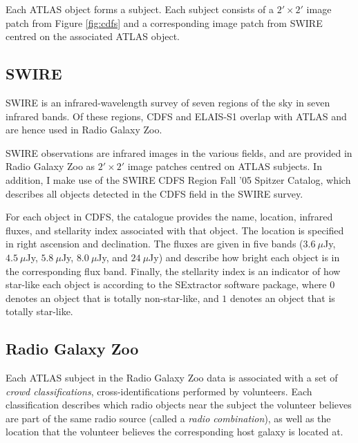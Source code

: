 \documentclass[a4paper]{article}
\newcommand{\fig}{Figure }
\begin{document}
      Each ATLAS object forms a subject. Each subject consists of a $2' \times 2'$ image patch from \fig \ref{fig:cdfs} and a corresponding image patch from SWIRE centred on the associated ATLAS object.

    \subsection{SWIRE}

      SWIRE is an infrared-wavelength survey of seven regions of the sky in seven infrared bands. Of these regions, CDFS and ELAIS-S1 overlap with ATLAS and are hence used in Radio Galaxy Zoo.

      SWIRE observations are infrared images in the various fields, and are provided in Radio Galaxy Zoo as $2' \times 2'$ image patches centred on ATLAS subjects. In addition, I make use of the SWIRE CDFS Region Fall '05 Spitzer Catalog\cite{surace05}, which describes all objects detected in the CDFS field in the SWIRE survey.

      For each object in CDFS, the catalogue provides the name, location, infrared fluxes, and stellarity index associated with that object. The location is specified in right ascension and declination. The fluxes are given in five bands ($3.6\ \mu$Jy, $4.5\ \mu$Jy, $5.8\ \mu$Jy, $8.0\ \mu$Jy, and $24\ \mu$Jy) and describe how bright each object is in the corresponding flux band. Finally, the stellarity index is an indicator of how star-like each object is according to the SExtractor software package, where $0$ denotes an object that is totally non-star-like, and $1$ denotes an object that is totally star-like\cite{surace05}.

    \subsection{Radio Galaxy Zoo}

      Each ATLAS subject in the Radio Galaxy Zoo data is associated with a set of \emph{crowd classifications}, cross-identifications performed by volunteers. Each classification describes which radio objects near the subject the volunteer believes are part of the same radio source (called a \emph{radio combination}), as well as the location that the volunteer believes the corresponding host galaxy is located at.
\end{document}
